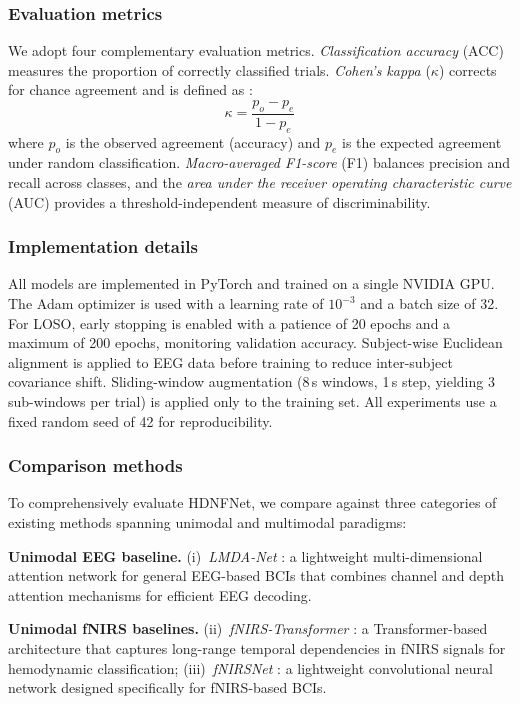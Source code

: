\documentclass[preprint,12pt,authoryear]{elsarticle}
\begin{document}
\subsubsection{Evaluation metrics}
We adopt four complementary evaluation metrics. \textit{Classification accuracy} (ACC) measures the proportion of correctly classified trials. \textit{Cohen's kappa} ($\kappa$) corrects for chance agreement and is defined as \citep{cohen1960coefficient}:
\begin{equation}
\label{eq:kappa}
\kappa = \frac{p_o - p_e}{1 - p_e}
\end{equation}
where $p_o$ is the observed agreement (accuracy) and $p_e$ is the expected agreement under random classification. \textit{Macro-averaged F1-score} (F1) balances precision and recall across classes, and the \textit{area under the receiver operating characteristic curve} (AUC) provides a threshold-independent measure of discriminability.

\subsubsection{Implementation details}
All models are implemented in PyTorch and trained on a single NVIDIA GPU. The Adam optimizer \citep{kingma2014adam} is used with a learning rate of $10^{-3}$ and a batch size of 32. For LOSO, early stopping is enabled with a patience of 20 epochs and a maximum of 200 epochs, monitoring validation accuracy. Subject-wise Euclidean alignment is applied to EEG data before training to reduce inter-subject covariance shift. Sliding-window augmentation (8\,s windows, 1\,s step, yielding 3 sub-windows per trial) is applied only to the training set. All experiments use a fixed random seed of 42 for reproducibility.

\subsubsection{Comparison methods}
To comprehensively evaluate HDNFNet, we compare against three categories of existing methods spanning unimodal and multimodal paradigms:

\noindent\textbf{Unimodal EEG baseline.} (i)~\textit{LMDA-Net} \citep{miao2023lmda}: a lightweight multi-dimensional attention network for general EEG-based BCIs that combines channel and depth attention mechanisms for efficient EEG decoding.

\noindent\textbf{Unimodal fNIRS baselines.} (ii)~\textit{fNIRS-Transformer} \citep{wang2022transformer_fnirs}: a Transformer-based architecture that captures long-range temporal dependencies in fNIRS signals for hemodynamic classification; (iii)~\textit{fNIRSNet} \citep{wickramaratne2023fnirsnet}: a lightweight convolutional neural network designed specifically for fNIRS-based BCIs.
\end{document}
